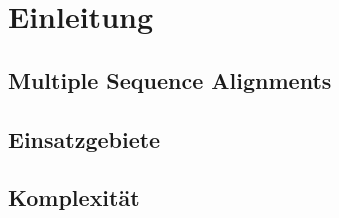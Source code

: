 \chapter{Einleitung}
\label{ch:einleitung}

\section{Multiple Sequence Alignments}

\section{Einsatzgebiete}

\section{Komplexität}